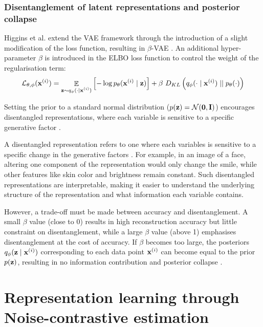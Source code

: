 \subsubsection{Disentanglement of latent representations and posterior collapse} \label{cha:disentang}
	Higgins et al. extend the VAE framework through the introduction of a slight modification of the loss function, resulting in $\beta$-VAE \cite{higginsBetaVAELearningBasic2022}. An additional hyper-parameter $\beta$ is introduced in the ELBO loss function to control the weight of the regularisation term:
	$$
	\mathcal{L}_{\theta, \phi} (\mathbf{x}^{(i)}) = \mathop{\mathbb{E}}_{\substack{\mathbf{z} \sim q_\phi (\cdot \mid \mathbf{x}^{(i)})}} \left[ -\log p_\theta (\mathbf{x}^{(i)} \mid \mathbf{z}) \right] + \beta~ D_{KL} \left(  q_\phi (\cdot \mid \mathbf{x}^{(i)})  \mid \mid  p_\theta(\cdot)  \right)
	$$
	
	Setting the prior to a standard normal distribution ($p(\mathbf{z}) = \mathcal{N}(\bm{\mathbf{0}}, \mathbf{I})$) encourages disentangled representations, where each variable is sensitive to a specific generative factor \cite{higginsBetaVAELearningBasic2022, bengioRepresentationLearningReview2013a}. 

	A disentangled representation refers to one where each variables is sensitive to a specific change in the generative factors \cite{higginsBetaVAELearningBasic2022, bengioRepresentationLearningReview2013a}. For example, in an image of a face, altering one component of the representation would only change the smile, while other features like skin color and brightness remain constant. Such disentangled representations are interpretable, making it easier to understand the underlying structure of the representation and what information each variable contains.
	
	However, a trade-off must be made between accuracy and disentanglement. A small $\beta$ value (close to 0) results in high reconstruction accuracy but little constraint on disentanglement, while a large $\beta$ value (above 1) emphasises disentanglement at the cost of accuracy. If $\beta$ becomes too large, the posteriors $q_\phi (\mathbf{z} \mid \mathbf{x}^{(i)})$ corresponding to each data point $\mathbf{x}^{(i)}$ can become equal to the prior $p(\mathbf{z})$, resulting in no information contribution and posterior collapse \cite{lucasUnderstandingPosteriorCollapse2022}.
	

	



\section{Representation learning through Noise-contrastive estimation}




